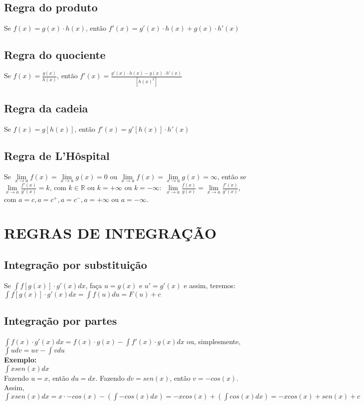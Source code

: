 \documentclass[12pt]{article}
\begin{document}
\subsection{Regra do produto}
Se $f(x) = g(x) \cdot h(x)$, então $f'(x) = g'(x) \cdot h(x) + g(x) \cdot h'(x)$

\subsection{Regra do quociente}
Se $f(x) = \displaystyle\frac{g(x)}{h(x)}$, então $f'(x) = \displaystyle\frac{g'(x) \cdot h(x) - g(x) \cdot h'(x)}{[h(x)^2]}$

\subsection{Regra da cadeia}
Se $f(x) = g[h(x)]$, então $f'(x) = g'[h(x)] \cdot h'(x)$

\subsection{Regra de L'Hôspital}
Se $\lim\limits_{x \to a} f(x) = \lim\limits_{x \to a} g(x) = 0$ ou $\lim\limits_{x \to a} f(x) = \lim\limits_{x \to a} g(x) = \infty$,
então se $\lim\limits_{x \to a} \displaystyle\frac{f'(x)}{g'(x)} = k$, com $k \in \mathbb{R}$ ou $k = +\infty$ ou $k = -\infty:$
$\lim\limits_{x \to a} \displaystyle\frac{f(x)}{g(x)} = \lim\limits_{x \to a} \displaystyle\frac{f'(x)}{g'(x)}$, com
$a = c, a = c^+, a = c^-, a = +\infty$ ou $a = -\infty.$

\section{REGRAS DE INTEGRAÇÃO}

\subsection{Integração por substituição}

Se $\displaystyle\int{f[g(x)] \cdot g'(x)dx}$, faça $u = g(x)$ e $u' = g'(x)$ e assim, teremos:
$\displaystyle\int{f[g(x)] \cdot g'(x)dx} = \displaystyle\int{f(u)du} = F(u) + c$


\subsection{Integração por partes}

$\displaystyle\int{f(x) \cdot g'(x)dx} = f(x) \cdot g(x) - \displaystyle\int{f'(x) \cdot g(x)dx}$ ou, simplesmente,
$\displaystyle\int{udv} = uv - \displaystyle\int{vdu}$\\[4mm]
\textbf{Exemplo:}\\[2mm]
$\displaystyle\int{xsen(x)dx}$\\[2mm]
Fazendo $u = x$, então $du = dx$. Fazendo $dv = sen(x)$, então $v = -cos(x)$. Assim,\\[2mm]
$\displaystyle\int{xsen(x)dx} = x \cdot -cos(x) - \left(\displaystyle\int{-cos(x)dx}\right) = -xcos(x) + \left(\displaystyle\int{cos(x)dx}\right) = -xcos(x) + sen(x) + c$
\end{document}
